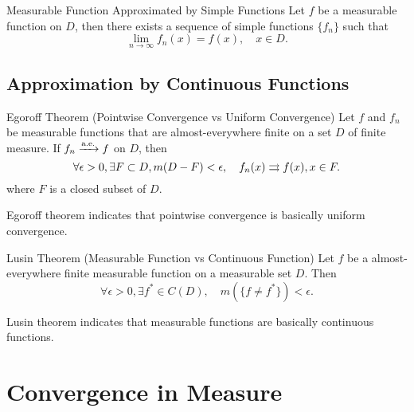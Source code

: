 \begin{theorem}{Measurable Function Approximated by Simple Functions}{}
  Let $f$ be a measurable function on $D$,
  then there exists a sequence of simple functions $\{f_n\}$ such that
  \begin{equation}
    \lim \limits _{n \rightarrow \infty} f_n(x) = f(x), \quad x \in D.
  \end{equation}
\end{theorem}

\subsection{Approximation by Continuous Functions}

\begin{theorem}{Egoroff Theorem (Pointwise Convergence vs Uniform Convergence)}{}
  Let $f$ and $f_n$ be measurable functions that are almost-everywhere finite
  on a set $D$ of finite measure.
  If $f_n \xrightarrow{\text{a.e.}} f$ on $D$,
  then
  \begin{equation}
    \forall \epsilon > 0, \exists F \subset D, m(D - F) < \epsilon, \quad
    f_n(x) \rightrightarrows f(x), x \in F.
  \end{equation}
  where $F$ is a closed subset of $D$.
\end{theorem}

\begin{note}
  Egoroff theorem indicates that pointwise convergence is basically uniform convergence.
\end{note}

\begin{theorem}{Lusin Theorem (Measurable Function vs Continuous Function)}{}
  Let $f$ be a almost-everywhere finite measurable function on a measurable set
  $D$.
  Then
  \begin{equation}
    \forall \epsilon > 0, \exists f^{\ast} \in C(D), \quad
    m(\{f \neq f^{\ast}\}) < \epsilon.
  \end{equation}
\end{theorem}

\begin{note}
  Lusin theorem indicates that measurable functions are basically continuous functions.
\end{note}

\section{Convergence in Measure}

